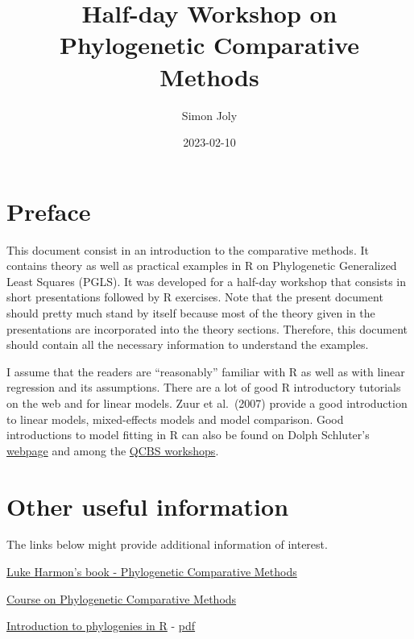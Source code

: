 \documentclass[
]{book}
\title{Half-day Workshop on Phylogenetic Comparative Methods}
\author{Simon Joly}
\date{2023-02-10}
\begin{document}
\maketitle

{
\setcounter{tocdepth}{1}
\tableofcontents
}
\hypertarget{preface}{%
\chapter{Preface}\label{preface}}

This document consist in an introduction to the comparative methods. It contains theory as well as practical examples in R on Phylogenetic Generalized Least Squares (PGLS). It was developed for a half-day workshop that consists in short presentations followed by R exercises. Note that the present document should pretty much stand by itself because most of the theory given in the presentations are incorporated into the theory sections. Therefore, this document should contain all the necessary information to understand the examples.

I assume that the readers are ``reasonably'' familiar with R as well as with linear regression and its assumptions. There are a lot of good R introductory tutorials on the web and for linear models. Zuur et al.~(2007) provide a good introduction to linear models, mixed-effects models and model comparison. Good introductions to model fitting in R can also be found on Dolph Schluter's \href{https://www.zoology.ubc.ca/~schluter/R/fit-model/}{webpage} and among the \href{http://qcbs.ca/wiki/r_workshop4}{QCBS workshops}.

\hypertarget{other-useful-information}{%
\chapter{Other useful information}\label{other-useful-information}}

The links below might provide additional information of interest.

\href{https://lukejharmon.github.io/pcm/}{Luke Harmon's book - Phylogenetic Comparative Methods}

\href{http://github.com/simjoly/CourseComparativeMethods/}{Course on Phylogenetic Comparative Methods}

\href{http://htmlpreview.github.com/?http://github.com/simjoly/CourseComparativeMethods/blob/master/lecture1/Introduction_phylo.html}{Introduction to phylogenies in R} - \href{http://github.com/simjoly/CourseComparativeMethods/blob/master/lecture1/Introduction_phylo.pdf}{pdf}
\end{document}
